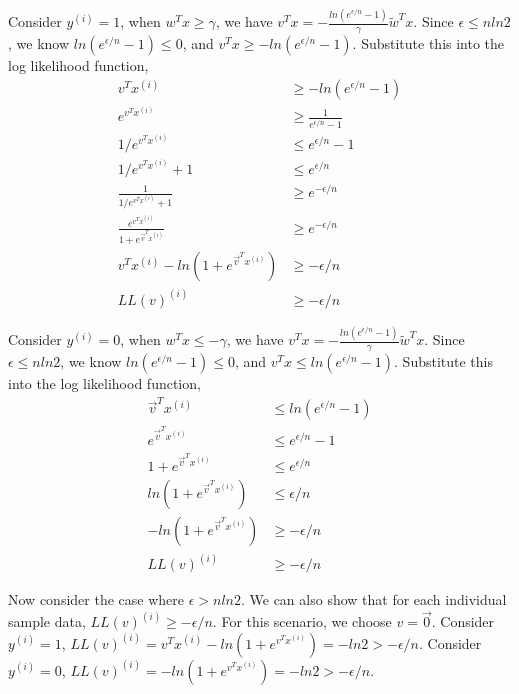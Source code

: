 \documentclass[11pt]{article}
\begin{document}
Consider $y^{(i)} = 1$, when $w^Tx\geq\gamma$, we have $v^Tx = -\frac{ln(e^{\epsilon / n}-1)}{\gamma} \widetilde{w}^Tx$. Since $\epsilon \leq nln2$, we know $ln(e^{\epsilon / n}-1) \leq 0$, and $v^Tx \geq -ln(e^{\epsilon / n}-1)$. Substitute this into the log likelihood function, 
\begin{equation}
    \begin{split}
        v^Tx^{(i)} &\geq -ln(e^{\epsilon / n} - 1) \\
        e^{v^Tx^{(i)}} &\geq \frac{1}{e^{\epsilon / n} - 1} \\
        1/e^{v^Tx^{(i)}} &\leq e^{\epsilon / n} - 1 \\
        1/e^{v^Tx^{(i)}} + 1 &\leq e^{\epsilon / n} \\
        \frac{1}{1/e^{v^Tx^{(i)}} + 1} &\geq e^{-\epsilon / n} \\
        \frac{e^{v^T x^{(i)}}}{1+e^{\Vec{v}^T x^{(i)}}} &\geq e^{-\epsilon / n} \\
        v^T x^{(i)}- ln(1+e^{\Vec{v}^T x^{(i)}}) &\geq -\epsilon / n \\
        LL(v)^{(i)} &\geq -\epsilon /n
    \end{split}
\end{equation}

Consider $y^{(i)} = 0$, when $w^Tx\leq-\gamma$, we have $v^Tx = -\frac{ln(e^{\epsilon / n}-1)}{\gamma} \widetilde{w}^Tx$. Since $\epsilon\leq nln2$, we know $ln(e^{\epsilon / n}-1) \leq 0$, and $v^Tx \leq ln(e^{\epsilon / n}-1)$. Substitute this into the log likelihood function, 
\begin{equation}
    \begin{split}
        \Vec{v}^T x^{(i)} &\leq ln(e^{\epsilon / n}-1) \\
        e^{\Vec{v}^T x^{(i)}} &\leq e^{\epsilon / n}-1 \\
        1+e^{\Vec{v}^T x^{(i)}} &\leq e^{\epsilon / n} \\
        ln(1+e^{\Vec{v}^T x^{(i)}}) &\leq \epsilon / n \\
        - ln(1+e^{\Vec{v}^T x^{(i)}}) &\geq -\epsilon / n \\
        LL(v)^{(i)} &\geq -\epsilon /n
    \end{split}
\end{equation}

Now consider the case where $\epsilon> nln2$. We can also show that for each individual sample data, $LL(v)^{(i)}\geq -\epsilon /n$. For this scenario, we choose $v=\Vec{0}$. Consider $y^{(i)}=1$, $LL(v)^{(i)}=v^Tx^{(i)}-ln(1+e^{v^Tx^{(i)}}) = -ln2>-\epsilon/n$. Consider $y^{(i)}=0$, $LL(v)^{(i)}=-ln(1+e^{v^Tx^{(i)}}) = -ln2>-\epsilon/n$. \\
\end{document}
